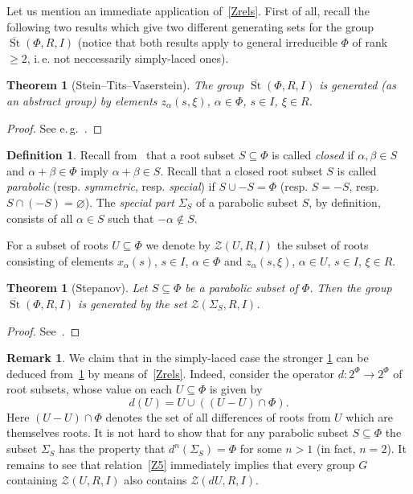 \documentclass[oneside, 8pt]{amsart}
\newtheorem{externaltheorem}[lemma]{Theorem}
\theoremstyle{remark}
\theoremstyle{definition}
\numberwithin{lemma}{section}
\numberwithin{prop}{section}
\numberwithin{corollary}{section}
\numberwithin{externaltheorem}{section}
\newtheorem{df}[lemma]{Definition} \Crefname{df}{Definition}{Definitions}
\newtheorem{rem}[lemma]{Remark}
\DeclareMathOperator{\St}{St}
\numberwithin{equation}{section}
\begin{document}
Let us mention an immediate application of~\cref{Zrels}.
First of all, recall the following two results which give two different generating sets for the group $\overline{\St}(\Phi, R, I)$ (notice that both results apply to general irreducible $\Phi$ of rank $\geq 2$, i.\,e. not neccessarily simply-laced ones).
\begin{externaltheorem}[Stein--Tits--Vaserstein] \label{thm:Tits} The group $\overline{\St}(\Phi, R, I)$ is generated (as an abstract group) by elements $z_\alpha(s, \xi)$, $\alpha \in \Phi$, $s \in I$, $\xi \in R$. \end{externaltheorem} \begin{proof} See e.\,g.~\cite[Theorem 2]{Va86}. \end{proof}

\begin{df} \label{df:root-subsets}
Recall from~\cite[Ch.~VI, \S~1.7]{Bou81} that a root subset $S \subseteq \Phi$ is called {\it closed} if $\alpha, \beta \in S$ and $\alpha+\beta\in \Phi$ imply $\alpha + \beta \in S$. 
Recall that a closed root subset $S$ is called {\it parabolic} (resp. {\it symmetric}, resp. {\it special}) if $S \cup -S = \Phi$ (resp. $S = -S$, resp. $S \cap (-S) = \varnothing$).
The {\it special part} $\Sigma_S$ of a parabolic subset $S$, by definition, consists of all $\alpha \in S$ such that $-\alpha \not\in S$.
\end{df}

For a subset of roots $U \subseteq \Phi$ we denote by $\mathcal{Z}(U, R, I)$ the subset of roots consisting of elements $x_\alpha(s)$, $s \in I$, $\alpha \in \Phi$ and $z_\alpha(s, \xi)$, $\alpha \in U$, $s\in I$, $\xi \in R$.
\begin{externaltheorem}[Stepanov] \label{thm:Stepanov} 
Let $S \subseteq \Phi$ be a parabolic subset of $\Phi$. Then the group $\overline{\St}(\Phi, R, I)$ is generated by the set $\mathcal{Z}(\Sigma_S, R, I)$.
 \end{externaltheorem} \begin{proof} See~\cite[Lemma~4]{S15}. \end{proof}

\begin{rem} We claim that in the simply-laced case the stronger \cref{thm:Stepanov} can be deduced from~\cref{thm:Tits} by means of~\cref{Zrels}. Indeed, consider the operator $d \colon 2^\Phi \to 2^\Phi$ of root subsets, whose value on each $U \subseteq \Phi$ is given by \[d(U) = U \cup \left((U - U)\cap \Phi\right).\]
Here $(U-U) \cap \Phi$ denotes the set of all differences of roots from $U$ which are themselves roots. It is not hard to show that for any parabolic subset $S \subseteq \Phi$ the subset $\Sigma_S$ has the property that $d^n(\Sigma_S) = \Phi$ for some $n>1$ (in fact, $n=2$). It remains to see that relation~\eqref{Z5} immediately implies that every group $G$ containing $\mathcal{Z}(U, R, I)$ also contains $\mathcal{Z}(dU, R, I)$. \end{rem}
\end{document}
